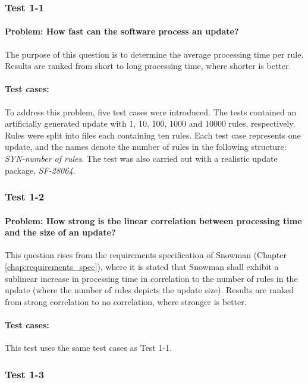 \subsubsection{Test 1-1}
\paragraph{Problem: How fast can the software process an update?}
The purpose of this question is to determine the average processing time per
rule. Results are ranked from short to long processing time, where shorter is
better.
\paragraph{Test cases:}
To address this problem, five test cases were introduced. The tests contained an
artificially generated update with 1, 10, 100, 1000 and 10000 rules,
respectively. Rules were split into files each containing ten rules. Each test
case represents one update, and the names denote the number of rules in the following structure:
\textit{SYN-number of rules}. The test was also carried out with a realistic
update package, \textit{SF-28064}.

\subsubsection{Test 1-2}
\paragraph{Problem: How strong is the linear correlation between processing time
and the size of an update?}
This question rises from the requirements specification of Snowman (Chapter
\ref{chap:requirements_spec}), where it is stated that Snowman shall exhibit a
sublinear increase in processing time in correlation to the number of rules in
the update (where the number of rules depicts the update size). Results are ranked
from strong correlation to no correlation, where stronger is better.
\paragraph{Test cases:}
This test uses the same test cases as Test 1-1.

\subsubsection{Test 1-3}
